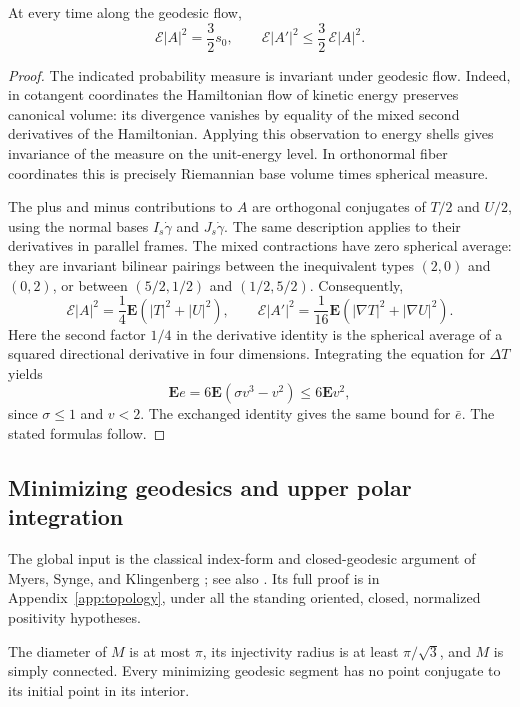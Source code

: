 \begin{lemma}\label{lem:geodesic-averages}
At every time along the geodesic flow,
\[
 \mathcal E|A|^2=\frac32s_0,\qquad
 \mathcal E|A'|^2\le\frac32\,\mathcal E|A|^2.
 \tag{8}\label{eq:8}
\]
\end{lemma}
\begin{proof}
The indicated probability measure is invariant under geodesic flow.
Indeed, in cotangent coordinates the Hamiltonian flow of kinetic energy
preserves canonical volume: its divergence vanishes by equality of the
mixed second derivatives of the Hamiltonian.  Applying this observation
to energy shells gives invariance of the measure on the unit-energy
level.  In orthonormal fiber coordinates this is precisely Riemannian
base volume times spherical measure.

The plus and minus contributions to $A$ are orthogonal conjugates of
$T/2$ and $U/2$, using the normal bases $I_s\dot\gamma$ and
$J_s\dot\gamma$.  The same description applies to their derivatives in
parallel frames.  The mixed contractions have zero spherical average:
they are invariant bilinear pairings between the inequivalent types
$(2,0)$ and $(0,2)$, or between $(5/2,1/2)$ and $(1/2,5/2)$.
Consequently,
\[
 \mathcal E|A|^2=\frac14\mathbf E(|T|^2+|U|^2),\qquad
 \mathcal E|A'|^2
 =\frac1{16}\mathbf E(|\nabla T|^2+|\nabla U|^2).
\]
Here the second factor $1/4$ in the derivative identity is the spherical
average of a squared directional derivative in four dimensions.
Integrating the equation for $\Delta T$ yields
\[
 \mathbf E e=6\mathbf E(\sigma v^3-v^2)\le6\mathbf E v^2,
\]
since $\sigma\le1$ and $v<2$.  The exchanged identity gives the same
bound for $\bar e$.  The stated formulas follow.
\end{proof}

\subsection{Minimizing geodesics and upper polar integration}

The global input is the classical index-form and closed-geodesic argument
of Myers, Synge, and Klingenberg
\cite{Myers1941,Synge1936,Klingenberg1959}; see also
\cite[Theorem~1.5 and Remark~1.2(ii)]{AbreschMeyer1997}.
Its full proof is in Appendix~\ref{app:topology}, under all the standing
oriented, closed, normalized positivity hypotheses.

\begin{lemma}\label{lem:volume-topology}
The diameter of $M$ is at most $\pi$, its injectivity radius is at least
$\pi/\sqrt3$, and $M$ is simply connected. Every minimizing geodesic
segment has no point conjugate to its initial point in its interior.
\end{lemma}

